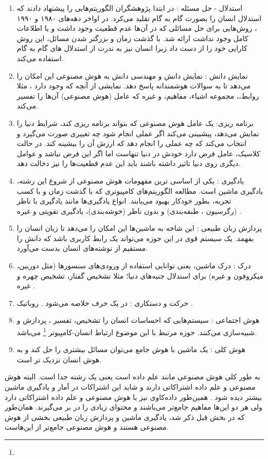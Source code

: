 \documentclass[a4paper, 12pt]{article}
\begin{document}
   \begin{enumerate}
   	\item
   	استدلال - حل مسئله :
   	در ابتدا پژوهشگران الگوریتم‌هایی را پیشنهاد دادند که استدلال انسان را بصورت گام به گام تقلید می‌کرد. در اواخر دهه‌های ۱۹۸۰ و ۱۹۹۰ ، روش‌هایی برای حل مسائلی که در آن‌ها عدم قطعیت وجود داشت و یا اطلاعات کامل وجود نداشت ارائه شد.  با گذشت زمان و بزرگتر شدن مسائل، این روش کارایی خود را از دست داد زیرا انسان نیز به ندرت از استدلال های گام به گام استفاده می‌کند.
   	\item
   	نمایش دانش :
   	نمایش دانش و مهندسی دانش به هوش مصنوعی این امکان را می‌دهد تا به سوالات هوشمندانه پاسخ دهد. نمایشی از آنچه که وجود دارد ، مثلا روابط،، مجموعه اشیاء، مفاهیم، و غیره که عامل (هوش مصنوعی)  آن‌ها را تفسیر می‌کند. 
   	
   	\item
   	برنامه ریزی:
   	یک عامل هوش مصنوعی که بتواند برنامه ریزی کند، شرایط دنیا را نمایش می‌دهد، پیشبینی می‌کند اگر عملی انجام شود چه تغییری صورت می‌گیرد و انتخاب می‌کند که چه عملی را انجام دهد که ارزش آن را بیشینه کند. در حالت کلاسیک، عامل فرض دارد خودش در دنیا تنهاست اما اگر این فرض نباشد و عوامل دیگری روی دنیا تاثیر داشته باشند باید این عدم قطعیت‌ها را نیز دخالت دهد. 
   	
   	\item
   	یادگیری :
   	یکی از اساسی ترین مفهومات هوش مصنوعی از شروع این رشته، یادگیری ماشین است. مطالعه الگوریتم‌های کامپیوتری که با گذشت زمان و با کسب تجربه، بطور خودکار بهبود می‌یابند. انواع یادگیری‌ها مانند یادگیری با ناظر (رگرسیون ، طبقه‌بندی) و بدون ناظر (خوشه‌بندی)، یادگیری تقویتی و غیره . 
   	
   	\item
   	پردازش زبان طبیعی :
   	این شاخه به ماشین‌ها این امکان را می‌دهد تا زبان انسان را بفهمد. یک سیستم قوی در این حوزه می‌تواند یک رابط کاربری باشد که دانش را مستقیم از نوشته‌های انسان بدست می‌آورد. 
   	\item
   	درک : 
   	درک ماشین، یعنی توانایی استفاده از ورودی‌های سنسور‌ها (مثل دوربین، میکروفون و غیره) برای استدلال جنبه‌های دنیا؛ مثلا تشخیص گفتار، تشخیص چهره و غیره .
   	  \item
   	  حرکت و دستکاری :
   	  در یک حرف خلاصه می‌شود . روباتیک .
   	  \item
   	  هوش اجتماعی :
   	  سیستم‌هایی که احساسات انسان را تشخیص، تفسیر ، پردازش و شبیه‌سازی می‌کنند. حوزه مرتبط با این موضوع ارتباط انسان-کامپیوتر
   	  \footnote{}
   	  می‌باشد. 
   	  \item
   	  هوش کلی :
   	  یک ماشین با هوش جامع می‌توان مسائل بیشتری را حل کند و به هوش انسان نزدیک تر است. 
   	  
   \end{enumerate} 
   به طور کلی هوش مصنوعی مانند علم داده است یعنی یک رشته جدا است. البته هوش مصنوعی و علم داده اشتراکاتی دارند و شاید این اشتراکات در آمار و یادگیری ماشین بیشتر دیده شود . همین‌طور داده‌کاوی نیز با هوش مصنوعی و علم داده اشتراکاتی دارد ولی هر دو این‌ها مفاهیم جامع‌تر می‌باشند و محتوای زیادی را در بر می‌گیرند. همان‌طور که در بخش قبل ذکر شد، یادگیری ماشین و پردازش زبان طبیعی بخشی از هوش مصنوعی هستند و هوش مصنوعی جامع‌تر از این‌هاست. 
   
\end{document}
